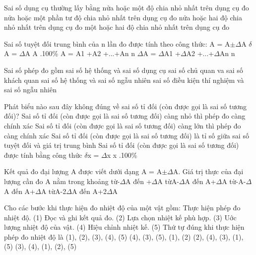 \begin{ex} Sai số dụng cụ thường lấy bằng
\choice
{\True nửa hoặc một độ chia nhỏ nhất trên dụng cụ đo}
{nửa hoặc một phần tư độ chia nhỏ nhất trên dụng cụ đo}
{nửa hoặc hai độ chia nhỏ nhất trên dụng cụ đo}
{một hoặc hai độ chia nhỏ nhất trên dụng cụ đo}
\loigiai{}
\end{ex}

\begin{ex} Sai số tuyệt đối trung bình của n lần đo được tính theo công thức:
\choice
{A = A$\pm$$\Delta$A}
{$\delta$A = $\Delta$A A .100\%}
{A = A1 +A2 +...+An n}
{\True $\Delta$A = $\Delta$A1 +$\Delta$A2 +...+$\Delta$An n}
\loigiai{}
\end{ex}

\begin{ex} Sai số phép đo gồm
\choice
{sai số hệ thống và sai số dụng cụ}
{sai số chủ quan va sai số khách quan}
{\True sai số hệ thống và sai số ngẫu nhiên}
{sai số điều kiện thí nghiệm và sai số ngẫu nhiên}
\loigiai{}
\end{ex}

\begin{ex} Phát biểu nào sau đây không đúng về sai số tỉ đối (còn được gọi là sai số
tương đối)?
\choice
{Sai số tỉ đối (còn được gọi là sai số tương đối) càng nhỏ thì phép đo càng chính xác}
{\True Sai số tỉ đối (còn được gọi là sai số tương đối) càng lớn thì phép đo càng chính xác}
{Sai số tỉ đối (còn được gọi là sai số tương đối) là tỉ số giữa sai số tuyệt đối và giá trị trung bình}
{Sai số tỉ đối (còn được gọi là sai số tương đối) được tính bằng công thức $\delta$x = $\Delta$x x .100\%}
\loigiai{}
\end{ex}

\begin{ex} Kết quả đo đại lượng A được viết dưới dạng A = A$\pm$$\Delta$A. Giá trị thực của đại
lượng cần đo A nằm trong khoảng
\choice
{từ-$\Delta$A đến +$\Delta$A}
{\True từA-$\Delta$A đến A+$\Delta$A}
{từ-A-$\Delta$A đến A+$\Delta$A}
{từA-2$\Delta$A đến A+2$\Delta$A}
\loigiai{}
\end{ex}

\begin{ex} Cho các bước khi thực hiện đo nhiệt độ của một vật gồm:
Thực hiện phép đo nhiệt độ.
(1)
Đọc và ghi kết quả đo.
(2)
Lựa chọn nhiệt kế phù hợp.
(3)
Uớc lượng nhiệt độ của vật.
(4)
Hiệu chỉnh nhiệt kế.
(5)
Thứ tự đúng khi thực hiện phép đo nhiệt độ là
\choice
{(1), (2), (3), (4), (5)}
{\True (4), (3), (5), (1), (2)}
{(2), (4), (3), (1), (5)}
{(3), (4), (1), (2), (5)}
\loigiai{}
\end{ex}

